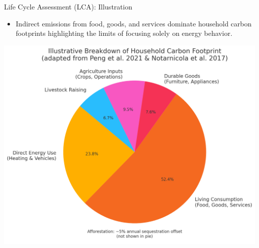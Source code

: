 \documentclass{beamer}
\begin{document}
\begin{frame}{Life Cycle Assessment (LCA): Illustration}
\vspace{-2.5em}
\footnotesize
\pause
\begin{itemize}
  \item Indirect emissions from food, goods, and services dominate household carbon footprints highlighting the limits of focusing solely on energy behavior.
\end{itemize}
\pause
\begin{center}
\includegraphics[width=0.68\linewidth]{LCA_pie.png}
\end{center}


\end{frame}
\end{document}
